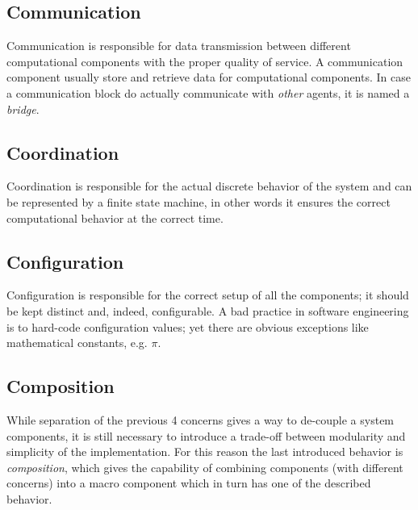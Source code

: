 \subsection{Communication}
Communication is responsible for data transmission between different computational components with the proper quality of service. A communication component usually store and retrieve data for computational components. In case a communication block do actually communicate with \emph{other} agents, it is named a \emph{bridge}.
\subsection{Coordination}
Coordination is responsible for the actual discrete behavior of the system and can be represented by a finite state machine, in other words it ensures the correct computational behavior at the correct time.
\subsection{Configuration}
Configuration is responsible for the correct setup of all the components; it should be kept distinct and, indeed, configurable. A bad practice in software engineering is to hard-code configuration values; yet there are obvious exceptions like mathematical constants, e.g. $\pi$.
\subsection{Composition}
While separation of the previous 4 concerns gives a way to de-couple a system components, it is still necessary to introduce a trade-off between modularity and simplicity of the implementation. For this reason the last introduced behavior is \emph{composition}, which gives the capability of combining components (with different concerns) into a macro component which in turn has one of the described behavior.




